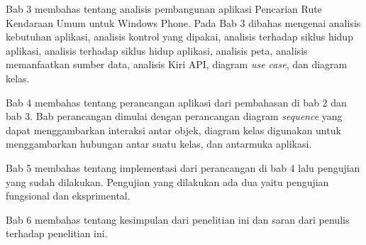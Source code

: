 Bab 3 membahas tentang analisis pembangunan aplikasi Pencarian Rute Kendaraan Umum untuk Windows Phone. Pada Bab 3 dibahas mengenai analisis kebutuhan aplikasi, analisis kontrol yang dipakai, analisis terhadap siklus hidup aplikasi, analisis terhadap siklus hidup aplikasi, analisis peta, analisis memanfaatkan sumber data, analisis Kiri API, diagram \textit{use case}, dan diagram kelas.

Bab 4 membahas tentang perancangan aplikasi dari pembahasan di bab 2 dan bab 3. Bab perancangan dimulai dengan perancangan diagram \textit{sequence} yang dapat menggambarkan interaksi antar objek, diagram kelas digunakan untuk menggambarkan hubungan antar suatu kelas, dan antarmuka aplikasi.

Bab 5 membahas tentang implementasi  dari perancangan di bab 4 lalu pengujian yang sudah dilakukan. Pengujian yang dilakukan ada dua yaitu pengujian fungsional dan eksprimental. 

Bab 6 membahas tentang kesimpulan dari penelitian ini dan saran dari penulis terhadap penelitian ini.